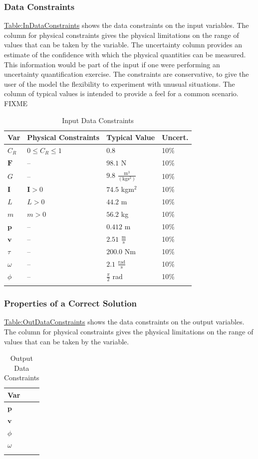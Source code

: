 \documentclass[12pt]{article}
\begin{document}
\subsubsection{Data Constraints}
\label{Sec:DataConstraints}
\hyperref[Table:InDataConstraints]{Table:InDataConstraints} shows the data constraints on the input variables. The column for physical constraints gives the physical limitations on the range of values that can be taken by the variable. The uncertainty column provides an estimate of the confidence with which the physical quantities can be measured. This information would be part of the input if one were performing an uncertainty quantification exercise. The constraints are conservative, to give the user of the model the flexibility to experiment with unusual situations. The column of typical values is intended to provide a feel for a common scenario. FIXME
\begin{longtable}{l l l l}
\toprule
\textbf{Var} & \textbf{Physical Constraints} & \textbf{Typical Value} & \textbf{Uncert.}
\\
\midrule
\endhead
${C_{R}}$ & $0\leq{}{C_{R}}\leq{}1$ & $0.8$ & 10$\%$
\\
$\mathbf{F}$ & -- & $98.1$ N & 10$\%$
\\
$G$ & -- & $9.8$ $\frac{\text{m}^{3}}{(\text{kg}\text{s}^{2})}$ & 10$\%$
\\
$\mathbf{I}$ & $\mathbf{I}>0$ & $74.5$ kg$\text{m}^{2}$ & 10$\%$
\\
$L$ & $L>0$ & $44.2$ m & 10$\%$
\\
$m$ & $m>0$ & $56.2$ kg & 10$\%$
\\
$\mathbf{p}$ & -- & $0.412$ m & 10$\%$
\\
$\mathbf{v}$ & -- & $2.51$ $\frac{\text{m}}{\text{s}}$ & 10$\%$
\\
$τ$ & -- & $200.0$ Nm & 10$\%$
\\
$ω$ & -- & $2.1$ $\frac{\text{rad}}{\text{s}}$ & 10$\%$
\\
$ϕ$ & -- & $\frac{π}{2}$ rad & 10$\%$
\\
\bottomrule
\caption{Input Data Constraints}
\label{Table:InDataConstraints}
\end{longtable}
\subsubsection{Properties of a Correct Solution}
\label{Sec:CorSolProps}
\hyperref[Table:OutDataConstraints]{Table:OutDataConstraints} shows the data constraints on the output variables. The column for physical constraints gives the physical limitations on the range of values that can be taken by the variable.
\begin{longtable}{l}
\toprule
\textbf{Var}
\\
\midrule
\endhead
$\mathbf{p}$
\\
$\mathbf{v}$
\\
$ϕ$
\\
$ω$
\\
\bottomrule
\caption{Output Data Constraints}
\label{Table:OutDataConstraints}
\end{longtable}
\end{document}
